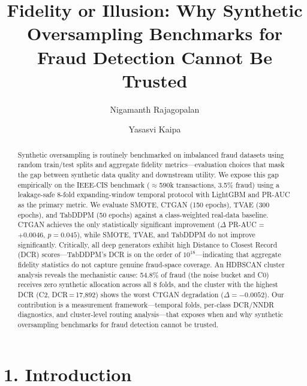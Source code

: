 \documentclass[sigconf]{acmart}
\title{Fidelity or Illusion: Why Synthetic Oversampling Benchmarks for Fraud Detection Cannot Be Trusted}
\author{Nigamanth Rajagopalan}
\affiliation{%
  \institution{University of Florida, Department of Computer Science and Informatics}
  \city{Gainesville}
  \country{USA}
}
\author{Yasasvi Kaipa}
\affiliation{%
  \institution{University of Florida, Department of Computer Science and Informatics}
  \city{Gainesville}
  \country{USA}
}
\begin{document}
\begin{abstract}
Synthetic oversampling is routinely benchmarked on imbalanced fraud datasets using random train/test splits and aggregate fidelity metrics---evaluation choices that mask the gap between synthetic data quality and downstream utility. We expose this gap empirically on the IEEE-CIS benchmark ($\approx$590k transactions, 3.5\% fraud) using a leakage-safe 8-fold expanding-window temporal protocol with LightGBM and PR-AUC as the primary metric. We evaluate SMOTE, CTGAN (150 epochs), TVAE (300 epochs), and TabDDPM (50 epochs) against a class-weighted real-data baseline. CTGAN achieves the only statistically significant improvement ($\Delta$ PR-AUC = $+0.0046$, $p = 0.045$), while SMOTE, TVAE, and TabDDPM do not improve significantly. Critically, all deep generators exhibit high Distance to Closest Record (DCR) scores---TabDDPM's DCR is on the order of $10^{18}$---indicating that aggregate fidelity statistics do not capture genuine fraud-space coverage. An HDBSCAN cluster analysis reveals the mechanistic cause: 54.8\% of fraud (the noise bucket and C0) receives zero synthetic allocation across all 8 folds, and the cluster with the highest DCR (C2, DCR\,=\,17,892) shows the worst CTGAN degradation ($\Delta = -0.0052$). Our contribution is a measurement framework---temporal folds, per-class DCR/NNDR diagnostics, and cluster-level routing analysis---that exposes when and why synthetic oversampling benchmarks for fraud detection cannot be trusted.
\end{abstract}
\maketitle


\section{1. Introduction}
\end{document}
